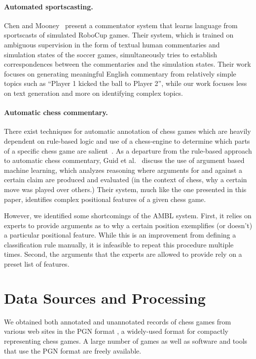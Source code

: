 \documentclass[11pt]{article}
\begin{document}
\paragraph{Automated sportscasting.} Chen and Mooney~ present a commentator system that learns language from sportscasts of simulated RoboCup games. Their system, which is trained on ambiguous supervision in the form of textual human commentaries and simulation states of the soccer games, simultaneously tries to establish correspondences between the commentaries and the simulation states. Their work focuses on generating meaningful English commentary from relatively simple topics such as ``Player 1 kicked the ball to Player 2'', while our work focuses less on text generation and more on identifying complex topics.

\paragraph{Automatic chess commentary.} There exist techniques for automatic annotation of chess games which are heavily dependent on rule-based logic and use of a chess-engine to determine which parts of a specific chess game are salient~\cite{cambridge-chess-annotation}. As a departure from the rule-based approach to automatic chess commentary, Guid et al.~ discuss the use of argument based machine learning, which analyzes reasoning where arguments for and against a certain claim are produced and evaluated (in the context of chess, why a certain move was played over others.) Their system, much like the one presented in this paper, identifies complex positional features of a given chess game.

However, we identified some shortcomings of the AMBL system. First, it relies on experts to provide arguments as to why a certain position exemplifies (or doesn’t) a particular positional feature. While this is an improvement from defining a classification rule manually, it is infeasible to repeat this procedure multiple times. Second, the arguments that the experts are allowed to provide rely on a preset list of features.

\section{Data Sources and Processing}
We obtained both annotated and unannotated records of chess games from various web sites in the PGN format \cite{pgn}, a widely-used format for compactly representing chess games. A large number of games as well as software and tools that use the PGN format are freely available. 
\end{document}
